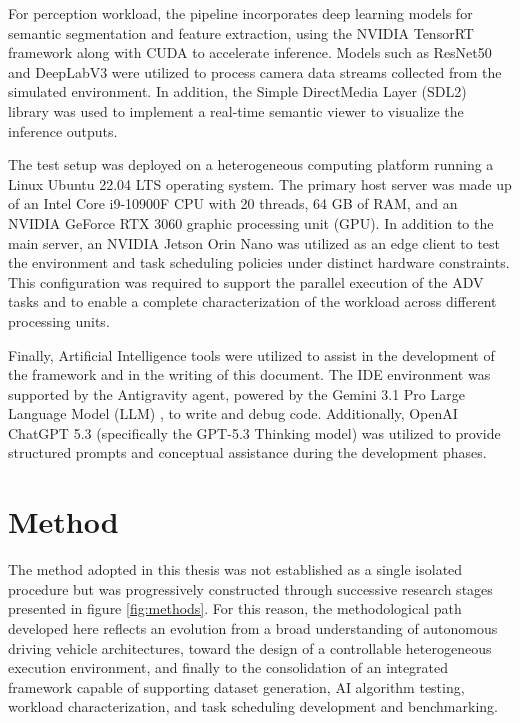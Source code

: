 For perception workload, the pipeline incorporates deep learning models for semantic segmentation and feature extraction, using the NVIDIA TensorRT framework along with CUDA to accelerate inference. Models such as ResNet50 and DeepLabV3 were utilized to process camera data streams collected from the simulated environment. In addition, the Simple DirectMedia Layer (SDL2) library was used to implement a real-time semantic viewer to visualize the inference outputs.

The test setup was deployed on a heterogeneous computing platform running a Linux Ubuntu 22.04 LTS operating system. The primary host server was made up of an Intel Core i9-10900F CPU with 20 threads, 64 GB of RAM, and an NVIDIA GeForce RTX 3060 graphic processing unit (GPU). In addition to the main server, an NVIDIA Jetson Orin Nano was utilized as an edge client to test the environment and task scheduling policies under distinct hardware constraints. This configuration was required to support the parallel execution of the ADV tasks and to enable a complete characterization of the workload across different processing units.

Finally, Artificial Intelligence tools were utilized to assist in the development of the framework and in the writing of this document. The IDE environment was supported by the Antigravity agent, powered by the Gemini 3.1 Pro Large Language Model (LLM) \cite{Reid2024Gemini15}, to write and debug code. Additionally, OpenAI ChatGPT 5.3 (specifically the GPT-5.3 Thinking model) \cite{OpenAI2023GPT4} was utilized to provide structured prompts and conceptual assistance during the development phases.


\section{Method}


The method adopted in this thesis was not established as a single isolated procedure but was progressively constructed through successive research stages presented in figure \ref{fig:methods}. For this reason, the methodological path developed here reflects an evolution from a broad understanding of autonomous driving vehicle architectures, toward the design of a controllable heterogeneous execution environment, and finally to the consolidation of an integrated framework capable of supporting dataset generation, AI algorithm testing, workload characterization, and task scheduling development and benchmarking.

